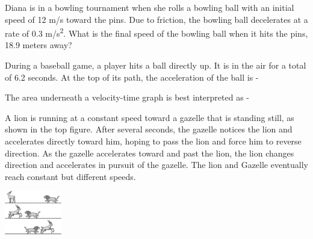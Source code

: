 \documentclass[10pt]{examdesign}
\begin{document}
\begin{multiplechoice} [title={Multiple Choice},
	rearrange=no]

	


\begin{question}
Diana is in a bowling tournament when she rolls a bowling ball with an initial speed of 12 m/s toward the pins.  Due to friction, the bowling ball decelerates at a rate of 0.3 m/s\textsuperscript{2}.  What is the final speed of the bowling ball when it hits the pins, 18.9 meters away?

\end{question}

\begin{question}
	During a baseball game, a player hits a ball directly up.  It is in the air for a total of 6.2 seconds.  At the top of its path, the acceleration of the ball is - 
\end{question}

\begin{question}
	The area underneath a velocity-time graph is best interpreted as - 
\end{question}




\begin{question}
	
A lion is running at a constant speed toward a gazelle that is standing still, as shown in the top figure.  After several seconds, the gazelle notices the lion and accelerates directly toward him, hoping to pass the lion and force him to reverse direction.  As the gazelle accelerates toward and past the lion, the lion changes direction and accelerates in pursuit of the gazelle.   The lion and Gazelle eventually reach constant but different speeds. 

\begin{center} \includegraphics[height=0.75in]{lg1.png} \end{center}



\end{question}
\end{multiplechoice}
\end{document}
